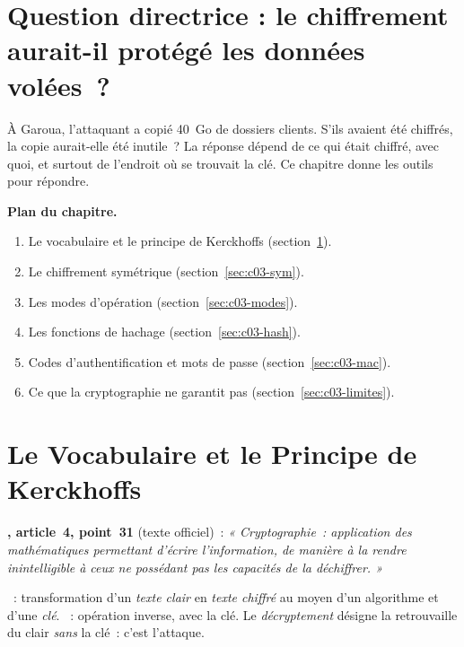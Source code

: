 \section*{Question directrice : le chiffrement aurait-il protégé les données volées~?}

À Garoua, l'attaquant a copié 40~Go de dossiers clients. S'ils avaient été
chiffrés, la copie aurait-elle été inutile~? La réponse dépend de ce qui
était chiffré, avec quoi, et surtout de l'endroit où se trouvait la clé. Ce
chapitre donne les outils pour répondre.

\medskip
\textbf{Plan du chapitre.}
\begin{enumerate}
    \item Le vocabulaire et le principe de Kerckhoffs (section~\ref{sec:c03-vocab}).
    \item Le chiffrement symétrique (section~\ref{sec:c03-sym}).
    \item Les modes d'opération (section~\ref{sec:c03-modes}).
    \item Les fonctions de hachage (section~\ref{sec:c03-hash}).
    \item Codes d'authentification et mots de passe (section~\ref{sec:c03-mac}).
    \item Ce que la cryptographie ne garantit pas (section~\ref{sec:c03-limites}).
\end{enumerate}

\separateur

\section{Le Vocabulaire et le Principe de Kerckhoffs}
\label{sec:c03-vocab}

\begin{boxjuris}
\textbf{, article~4, point~31} (texte officiel)~:
\textit{« Cryptographie~: application des mathématiques permettant d'écrire
l'information, de manière à la rendre inintelligible à ceux ne possédant
pas les capacités de la déchiffrer. »}
\end{boxjuris}

\begin{boxdef}
~: transformation d'un \emph{texte clair} en
\emph{texte chiffré} au moyen d'un algorithme et d'une \emph{clé}.
~: opération inverse, avec la clé. Le
\emph{décryptement} désigne la retrouvaille du clair \emph{sans} la clé~:
c'est l'attaque.
\end{boxdef}

